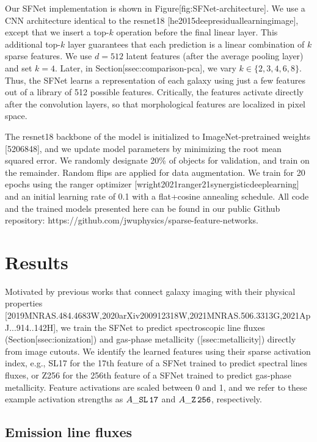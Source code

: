 \documentclass[11pt,a4paper]{article}
\begin{document}
Our SFNet implementation is shown in Figure[fig:SFNet-architecture]. We use a CNN architecture identical to the resnet18 [he2015deepresiduallearningimage], except that we insert a top-$k$ operation before the final linear layer. 
This additional top-$k$ layer guarantees that each prediction is a linear combination of $k$ sparse features.
We use $d=512$ latent features (after the average pooling layer) and set $k=4$. Later, in Section[ssec:comparison-pca], we vary $k \in \{2, 3, 4, 6, 8\}$. Thus, the SFNet learns a representation of each galaxy using just a few features out of a library of 512 possible features.
Critically, the features activate directly after the convolution layers, so that morphological features are localized in pixel space.

The resnet18 backbone of the model is initialized to ImageNet-pretrained weights [5206848], and we update model parameters by minimizing the root mean squared error. We randomly designate 20\% of objects for validation, and train on the remainder. Random flips are applied for data augmentation. We train for 20 epochs using the ranger optimizer [wright2021ranger21synergisticdeeplearning] and an initial learning rate of 0.1 with a flat+cosine annealing schedule. All code and the trained models presented here can be found in our public Github repository: https://github.com/jwuphysics/sparse-feature-networks.

\section{Results}

Motivated by previous works that connect galaxy imaging with their physical properties [2019MNRAS.484.4683W,2020arXiv200912318W,2021MNRAS.506.3313G,2021ApJ...914..142H], we train the SFNet to predict spectroscopic line fluxes (Section[ssec:ionization]) and gas-phase metallicity ([ssec:metallicity]) directly from image cutouts.
We identify the learned features using their sparse activation index, e.g., SL17 for the 17th feature of a SFNet trained to predict spectral lines fluxes, or Z256 for the 256th feature of a SFNet trained to predict gas-phase metallicity. Feature activations are scaled between 0 and 1, and we refer to these example activation strengths as $A\_{\tt SL\,17}$ and $A\_{\tt Z\,256}$, respectively.

\subsection{Emission line fluxes}
\end{document}
